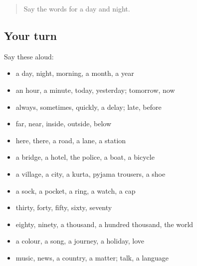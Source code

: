 \label{lesson:MW-R89-second-pass-time-places-the-town-clothes-and-numbers}



\begin{quote}
Say the words for a day and night.
\end{quote}

\subsection*{Your turn}
Say these aloud:

\begin{itemize}
\raggedright
  \item a day, night, morning, a month, a year
  \item an hour, a minute, today, yesterday; tomorrow, now
  \item always, sometimes, quickly, a delay; late, before
  \item far, near, inside, outside, below
  \item here, there, a road, a lane, a station
  \item a bridge, a hotel, the police, a boat, a bicycle
  \item a village, a city, a kurta, pyjama trousers, a shoe
  \item a sock, a pocket, a ring, a watch, a cap
  \item thirty, forty, fifty, sixty, seventy
  \item eighty, ninety, a thousand, a hundred thousand, the world
  \item a colour, a song, a journey, a holiday, love
  \item music, news, a country, a matter; talk, a language
\end{itemize}

